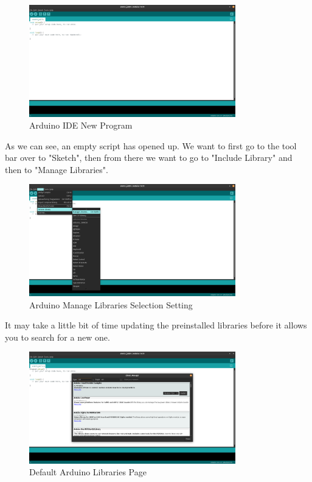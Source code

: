 \documentclass[a4paper,11pt]{report}
\begin{document}
\begin{figure}[H]
\centering
\includegraphics[width=0.8\textwidth]{screenshots/arduinoidestartup}
\caption{Arduino IDE New Program}
\end{figure}

As we can see, an empty script has opened up. We want to first go to the tool bar over to "Sketch", then from there we want to go to "Include Library" and then to "Manage Libraries".

\begin{figure}[H]
\centering
\includegraphics[width=0.8\textwidth]{screenshots/arduinomanagelibrariesselect}
\caption{Arduino Manage Libraries Selection Setting}
\end{figure}

It may take a little bit of time updating the preinstalled libraries before it allows you to search for a new one.

\begin{figure}[H]
\centering
\includegraphics[width=0.8\textwidth]{screenshots/arduinolibrariespage}
\caption{Default Arduino Libraries Page}
\end{figure}
\end{document}
